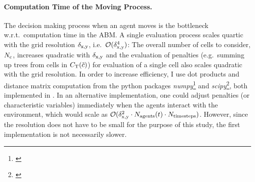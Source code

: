 \paragraph{Computation Time of the Moving Process.}
The decision making process when an agent moves is the bottleneck w.r.t.\ computation time in the ABM.
A single evaluation process scales quartic with the grid resolution $\delta_{\rm x,y}$, i.e.\ $\mathcal{O}(\delta_{\rm x,y}^4)$: The overall number of cells to consider, $N_{\rm c}$, increases quadratic with $\delta_{\rm x,y}$ and the evaluation of penalties (e.g.\ summing up trees from cells in $C_{\rm T}(\tilde{c})$) for evaluation of a single cell also scales quadratic with the grid resolution.
In order to increase efficiency, I use dot products and distance matrix computation from the python packages \textit{numpy}\footnote{\citet{numpy}} and \textit{scipy}\footnote{\citet{scipy}}, both implemented in \CC.
In an alternative implementation, one could adjust penalties (or characteristic variables) immediately when the agents interact with the environment, which would scale as $\mathcal{O}(\delta_{\rm x,y}^2\cdot N_{\rm agents}(t)\cdot N_{\rm timesteps})$.
However, since the resolution does not have to be small for the purpose of this study, the first implementation is not necessarily slower.
	
		
		

















